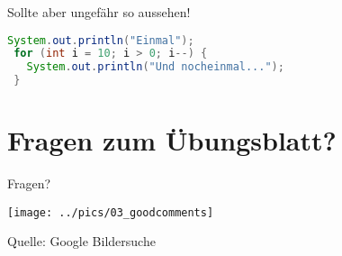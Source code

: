 \documentclass[18pt]{beamer}
\begin{document}
\begin{frame}[fragile]{Sollte aber ungefähr so aussehen!}
 \begin{lstlisting}[language=java]
 System.out.println("Einmal");
 for (int i = 10; i > 0; i--) {
   System.out.println("Und nocheinmal...");
 }
 \end{lstlisting}
\end{frame}
\section{Fragen zum Übungsblatt?}
\begin{frame}{Fragen?}
\end{frame}



\begin{frame}
 \texttt{[image: ../pics/03\_goodcomments]}
 
 \tiny{Quelle: Google Bildersuche}
\end{frame}
\end{document}
